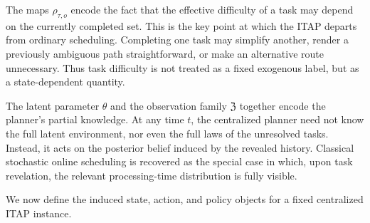 \begin{remark}
The maps \(\rho_{\tau,o}\) encode the fact that the effective difficulty of a task may depend on the currently completed set. This is the key point at which the ITAP departs from ordinary scheduling. Completing one task may simplify another, render a previously ambiguous path straightforward, or make an alternative route unnecessary. Thus task difficulty is not treated as a fixed exogenous label, but as a state-dependent quantity.
\end{remark}

\begin{remark}
The latent parameter \(\theta\) and the observation family \(\mathfrak Z\) together encode the planner's partial knowledge. At any time \(t\), the centralized planner need not know the full latent environment, nor even the full laws of the unresolved tasks. Instead, it acts on the posterior belief induced by the revealed history. Classical stochastic online scheduling is recovered as the special case in which, upon task revelation, the relevant processing-time distribution is fully visible.
\end{remark}

We now define the induced state, action, and policy objects for a fixed centralized ITAP instance.

